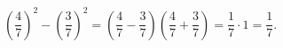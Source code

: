 $\left(\dfrac47\right)^2-\left(\dfrac37\right)^2=\left(\dfrac47-\dfrac37\right)\left(\dfrac47+\dfrac37\right)=\dfrac17\cdot1=\boxed{\dfrac17}$.
